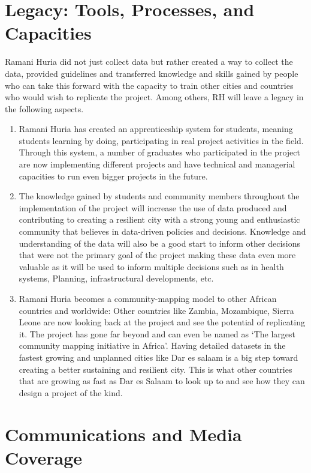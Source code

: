 \documentclass[a4paper,12pt,twoside]{article}
\begin{document}
\section{Legacy: Tools, Processes, and Capacities}

Ramani Huria did not just collect data but rather created a way to collect the data, provided guidelines and transferred knowledge and skills gained by people who can take this forward with the capacity to train other cities and countries who would wish to replicate the project. Among others, RH will leave a legacy in the following aspects.
\begin{enumerate}
    \item Ramani Huria has created an apprenticeship system for students, meaning students learning by doing, participating in real project activities in the field. Through this system, a number of graduates who participated in the project are now implementing different projects and have technical and managerial capacities to run even bigger projects in the future.
    \item The knowledge gained by students and community members throughout the implementation of the project will increase the use of data produced and contributing to creating a resilient city with a strong young and enthusiastic community that believes in data-driven policies and decisions. Knowledge and understanding of the data will also be a good start to inform other decisions that were not the primary goal of the project making these data even more valuable as it will be used to inform multiple decisions such as in health systems, Planning, infrastructural developments, etc.
    \item Ramani Huria becomes a community-mapping model to other African countries and worldwide: Other countries like Zambia, Mozambique, Sierra Leone are now looking back at the project and see the potential of replicating it. The project has gone far beyond and can even be named as  ‘The largest community mapping initiative in Africa’. Having detailed datasets in the fastest growing and unplanned cities like Dar es salaam is a big step toward creating a better sustaining and resilient city. This is what other countries that are growing as fast as  Dar es Salaam to look up to and see how they can design a project of the kind.

\end{enumerate}
\newpage
\section{Communications and Media Coverage}
\end{document}
